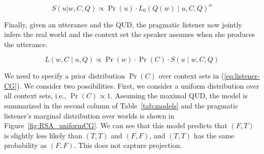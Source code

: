 \vspace{-6pt}
\begin{equation}
S(u | w, C, Q) \propto \Pr(u) \cdot L_0(Q(w) \mid u, C, Q)^\alpha \label{eq:speaker-CG}
\end{equation}
 
Finally, given an utterance and the QUD, the pragmatic listener now jointly infers 
 the real world and the context set the speaker assumes when she produces the utterance. 

\vspace{-6pt} 
\begin{equation}
L(w, C \mid u, Q) \propto \Pr(w) \cdot \Pr(C) \cdot S(u \mid w, C, Q)
\label{eq:listener-CG}
\end{equation}

We need to specify a prior distribution $\Pr(C)$ 
 over context sets in (\ref{eq:listener-CG}).
We consider two possibilities. 
First, we consider a uniform distribution over all context sets, i.e., 
 $\Pr(C)\propto 1$.
Assuming the maximal QUD, the model is summarized in the second column of 
 Table~\ref{tab:models} and the pragmatic listener's marginal distribution over 
 worlds is shown in Figure~\ref{fig:RSA_uniformCG}.
We can see that this model predicts that $(F, T)$ is slightly 
 less likely than $(T, T)$ and $(F, F)$, 
 and $(T, T)$ has the same probability as $(F, F)$. 
This does not capture projection.


